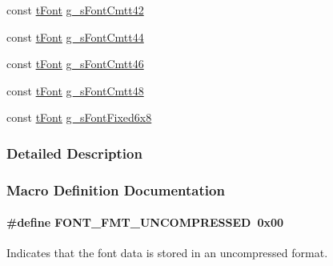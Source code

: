 \begin{DoxyCompactItemize}
\item 
const \hyperlink{structt_font}{t\+Font} \hyperlink{group__primitives__api_ga843f726850fa7e39ad0bda97915cb8d0}{g\+\_\+s\+Font\+Cmtt42}
\item 
const \hyperlink{structt_font}{t\+Font} \hyperlink{group__primitives__api_ga5512c3e9000658899378acd15b9443af}{g\+\_\+s\+Font\+Cmtt44}
\item 
const \hyperlink{structt_font}{t\+Font} \hyperlink{group__primitives__api_ga18b44bfbc08558e8b050befaf12aa82d}{g\+\_\+s\+Font\+Cmtt46}
\item 
const \hyperlink{structt_font}{t\+Font} \hyperlink{group__primitives__api_gab7c00d3e93612bcbb6f93f6256feefa4}{g\+\_\+s\+Font\+Cmtt48}
\item 
const \hyperlink{structt_font}{t\+Font} \hyperlink{group__primitives__api_ga96f4c7b60b2da06258398944eceea83f}{g\+\_\+s\+Font\+Fixed6x8}
\end{DoxyCompactItemize}


\subsubsection{Detailed Description}


\subsubsection{Macro Definition Documentation}
\paragraph[{F\+O\+N\+T\+\_\+\+F\+M\+T\+\_\+\+U\+N\+C\+O\+M\+P\+R\+E\+S\+S\+E\+D}]{\setlength{\rightskip}{0pt plus 5cm}\#define F\+O\+N\+T\+\_\+\+F\+M\+T\+\_\+\+U\+N\+C\+O\+M\+P\+R\+E\+S\+S\+E\+D~0x00}\label{group__primitives__api_ga2a31fdac9b1c2fa434ae27fd819a4eec}


Indicates that the font data is stored in an uncompressed format. 

